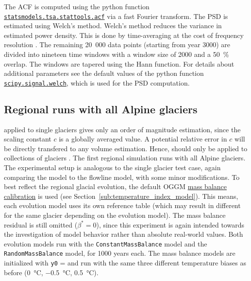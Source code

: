        The ACF is computed using the python function \href{https://www.statsmodels.org/devel/generated/statsmodels.tsa.stattools.acf.html}{\lstinline`statsmodels.tsa.stattools.acf`} via a fast Fourier transform. The PSD is estimated using Welch's method. Welch's method reduces the variance in estimated power density. This is done by time-averaging at the cost of frequency resolution \citep[e.g.,][]{Welch1967, Proakis2007}. The remaining 20\ 000 data points (starting from year 3000) are divided into nineteen time windows with a window size of 2000  and a \SI{50}{\percent} overlap. The windows are tapered using the Hann function. For details about additional parameters see the default values of the python function \href{https://docs.scipy.org/doc/scipy/reference/generated/scipy.signal.welch.html}{\lstinline`scipy.signal.welch`}, which is used for the PSD computation.
    

    \subsection{Regional runs with all Alpine glaciers} %
    \label{sub:regional_runs_with_all_alpine_glaciers_setup}
        \Vas{} applied to single glaciers gives only an order of magnitude estimation, since the scaling constant $c$ is a globally averaged value. A potential relative error in $c$ will be directly transfered to any volume estimation. Hence, \vas{} should only be applied to collections of glaciers \citep{Bahr2015}. 
        The first regional simulation runs with all Alpine glaciers. The experimental setup is analogous to the single glacier test case, again comparing the \vas{} model to the flowline model, with some minor modifications. To best reflect the regional glacial evolution, the default OGGM \hyperref[ssub:mb_calib]{mass balance calibration} is used (see Section~\ref{sub:temperature_index_model}). This means, each evolution model uses its own \tstar{} reference table (which may result in different \tstar{} for the same glacier depending on the evolution model). The mass balance residual is still omitted ($\beta^* = 0$), since this experiment is again intended towards the investigation of model behavior rather than absolute real-world values.
        Both evolution models run with the \lstinline`ConstantMassBalance` model and the \lstinline`RandomMassBalance` model, for 1000 years each. The mass balance models are initialized with \lstinline`y0` = \tstar{} and run with the same three different temperature biases as before (\SI{0}{\celsius}, \SI{-0.5}{\celsius}, \SI{+0.5}{\celsius}).
    
